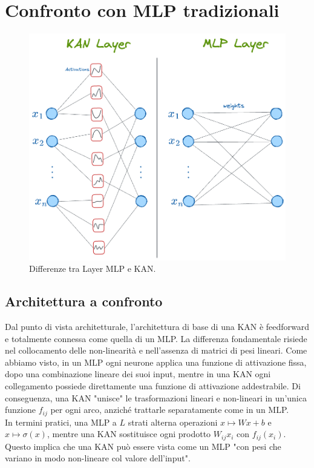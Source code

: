 \documentclass[a4paper,12pt]{report}
\begin{document}
	\section{Confronto con MLP tradizionali}
	
	\begin{figure}[H]
		\centering
		\includegraphics[width=1.0\textwidth]{img/KANvsMLP_layer.png}
		\caption{Differenze tra Layer MLP e KAN.}
	\end{figure}
	
	\subsection{Architettura a confronto}
	Dal punto di vista architetturale, l’architettura di base di una KAN è feedforward e totalmente connessa come quella di un MLP. La differenza fondamentale risiede nel collocamento delle non-linearità e nell’assenza di matrici di pesi lineari. Come abbiamo visto, in un MLP ogni neurone applica una funzione di attivazione fissa, dopo una combinazione lineare dei suoi input, mentre in una KAN ogni collegamento possiede direttamente una funzione di attivazione addestrabile. Di conseguenza, una KAN "unisce" le trasformazioni lineari e non-lineari in un’unica funzione $f_{ij}$ per ogni arco, anziché trattarle separatamente come in un MLP. \\
	In termini pratici, una MLP a $L$ strati alterna operazioni $x \mapsto W x + b$ e $x \mapsto \sigma(x)$, mentre una KAN sostituisce ogni prodotto $W_{ij}x_i$ con $f_{ij}(x_i)$. Questo implica che una KAN può essere vista come un MLP "con pesi che variano in modo non-lineare col valore dell'input". \\
	
\end{document}
